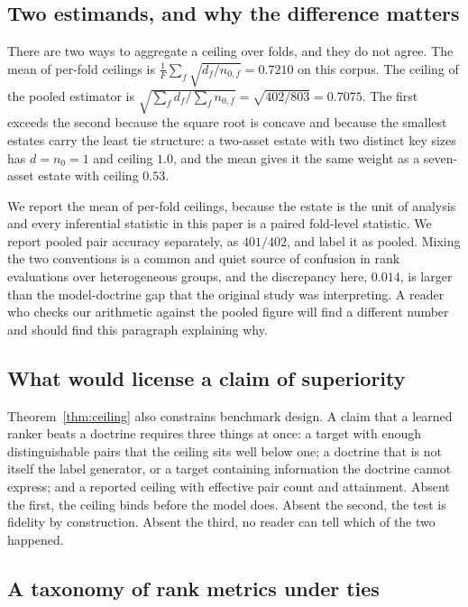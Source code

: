 \documentclass[journal,10pt]{IEEEtran}
\newcommand{\distinct}{d}
\newcommand{\nzero}{n_0}
\begin{document}
\subsection{Two estimands, and why the difference matters}
\label{sec:estimands}

There are two ways to aggregate a ceiling over folds, and they do not agree. The mean of per-fold
ceilings is $\frac{1}{F}\sum_f\sqrt{d_f/n_{0,f}}=0.7210$ on this corpus. The ceiling of
the pooled estimator is $\sqrt{\sum_f d_f/\sum_f n_{0,f}}=\sqrt{402/803}=0.7075$. The first
exceeds the second because the square root is concave and because the smallest estates carry the
least tie structure: a two-asset estate with two distinct key sizes has $\distinct=\nzero=1$ and
ceiling $1.0$, and the mean gives it the same weight as a seven-asset estate with ceiling $0.53$.

We report the mean of per-fold ceilings, because the estate is the unit of analysis and every
inferential statistic in this paper is a paired fold-level statistic. We report pooled pair
accuracy separately, as $401/402$, and label it as pooled. Mixing the two conventions is a common
and quiet source of confusion in rank evaluations over heterogeneous groups, and the discrepancy
here, $0.014$, is larger than the model-doctrine gap that the original study was interpreting. A
reader who checks our arithmetic against the pooled figure will find a different number and should
find this paragraph explaining why.

\subsection{What would license a claim of superiority}

Theorem~\ref{thm:ceiling} also constrains benchmark design. A claim that a learned ranker beats a
doctrine requires three things at once: a target with enough distinguishable pairs that the ceiling
sits well below one; a doctrine that is not itself the label generator, or a target containing
information the doctrine cannot express; and a reported ceiling with effective pair count and
attainment. Absent the first, the ceiling binds before the model does. Absent the second, the test
is fidelity by construction. Absent the third, no reader can tell which of the two happened.

\subsection{A taxonomy of rank metrics under ties}
\label{sec:taxonomy}
\end{document}
